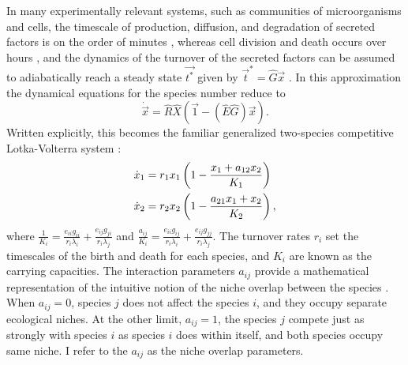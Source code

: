 In many experimentally relevant systems, such as communities of microorganisms and cells, the timescale of production, diffusion, and degradation of secreted factors is on the order of minutes \cite{Belle2006}, whereas cell division and death occurs over hours \cite{Powell1956,Lenski1991}, and the dynamics of the turnover of the secreted factors can be assumed to adiabatically reach a steady state $\vec{t^*}$ given by $\vec{t}^* = \hat{G} \vec{x}$ \cite{Posfai2017,Assaf2016,Chotibut2017a}. %
In this approximation the dynamical equations for the species number reduce to
\begin{equation}
\dot{\vec{x}} = \hat{R}\hat{X} \left( \vec{1} - (\hat{E}\hat{G})\vec{x} \right).
 \label{eq-xdot-adiabatic}
\end{equation}
Written explicitly, this becomes the familiar generalized two-species competitive Lotka-Volterra system \cite{Chotibut2015,MacArthur1970,Dobrinevski2012,Constable2015,Bomze1983,Levin1970,Czuppon2017,Young2018}:
\begin{align}
\dot{x}_1 &= r_1 x_1 \left( 1 - \frac{x_1 + a_{12} x_2}{K_1} \right) \notag \\
\dot{x}_2 &= r_2 x_2 \left( 1 - \frac{a_{21} x_1 + x_2}{K_2} \right),
 \label{mean-field-eqns}
\end{align}
where $\frac{1}{K_i} = \frac{e_{ii} g_{ii}}{r_i \lambda_i} + \frac{e_{ij} g_{ji}}{r_i \lambda_j}$ and $\frac{a_{ij}}{K_i} = \frac{e_{ii} g_{ij}}{r_i \lambda_i} + \frac{e_{ij} g_{jj}}{r_i \lambda_j}$. %
The turnover rates $r_i$ set the timescales of the birth and death for each species, and $K_i$ are known as the carrying capacities. 
The interaction parameters $a_{ij}$ provide a mathematical representation of the intuitive notion of the niche overlap between the species \cite{MacArthur1967,Abrams1980,Schoener1985,Chesson2008}. 
When $a_{ij}=0$, species $j$ does not affect the species $i$, and they occupy separate ecological niches. 
At the other limit, $a_{ij}=1$, the species $j$ compete just as strongly with species $i$ as species $i$ does within itself, and both species occupy same niche. 
I refer to the $a_{ij}$ as the niche overlap parameters.

